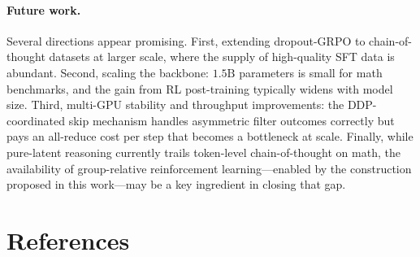 \documentclass[11pt]{article}
\theoremstyle{definition}
\theoremstyle{remark}
\begin{document}
\paragraph{Future work.}
Several directions appear promising.  First, extending dropout-GRPO
to chain-of-thought datasets at larger scale, where the supply of
high-quality SFT data is abundant.  Second, scaling the backbone:
$1.5\mathrm{B}$ parameters is small for math benchmarks, and the
gain from RL post-training typically widens with model size.  Third,
multi-GPU stability and throughput improvements: the
DDP-coordinated skip mechanism handles asymmetric filter outcomes
correctly but pays an all-reduce cost per step that becomes a
bottleneck at scale.  Finally, while pure-latent reasoning currently
trails token-level chain-of-thought on math, the availability of
group-relative reinforcement learning---enabled by the construction
proposed in this work---may be a key ingredient in closing that gap.

\section*{References}
\end{document}
